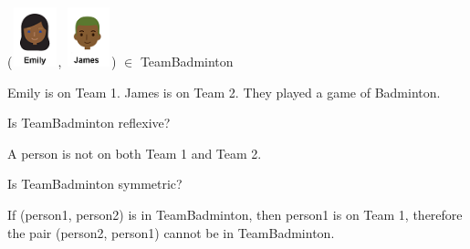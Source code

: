 \documentclass{ximera}
\begin{document}
\begin{exercise}



 ({\includegraphics[width=50px,height=65px]{pics/people/emily.png}}, {\includegraphics[width=50px,height=65px]{pics/people/james.png}}) $\in$ TeamBadminton 

  \begin{multipleChoice}
  \end{multipleChoice}
  \begin{feedback}
Emily is on Team 1. James is on Team 2.  They played a game of Badminton.
  \end{feedback}
\end{exercise}



\begin{exercise}
Is TeamBadminton reflexive?

  \begin{multipleChoice}
  \end{multipleChoice}
  \begin{feedback}
A person is not on both Team 1 and Team 2.
  \end{feedback}
\end{exercise}




\begin{exercise}
Is TeamBadminton symmetric?

  \begin{multipleChoice}
  \end{multipleChoice}
  \begin{feedback}
  If (person1, person2) is in TeamBadminton, then person1 is on Team 1, therefore the pair (person2, person1) cannot be in TeamBadminton.
  \end{feedback}
\end{exercise}
\end{document}

